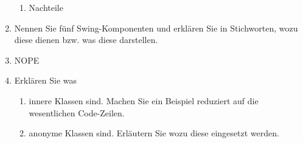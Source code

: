 \begin{enumerate}
\begin{enumerate}[label=(\alph*)]
            \item Nachteile
        \end{enumerate}
    \item Nennen Sie fünf Swing-Komponenten und erklären Sie in
        Stichworten, wozu diese dienen bzw. was diese darstellen.
    \item NOPE
    \item Erklären Sie was 
        \begin{enumerate}[label=(\alph*)]
            \item innere Klassen sind. 
                Machen Sie ein Beispiel reduziert auf die wesentlichen
                Code-Zeilen.
            \item anonyme Klassen sind. Erläutern Sie wozu diese 
                eingesetzt werden. 
        \end{enumerate}
\end{enumerate}
